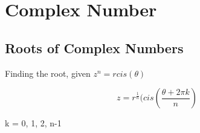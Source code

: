 \documentclass[../main.tex]{subfiles}
\begin{document}
\section{Complex Number}

\subsection{Roots of Complex Numbers}

Finding the root, given $z^n = r cis(\theta)$

\[ z = r^{\frac{1}{n}} (cis(\frac{\theta + 2 \pi k}{n}) \]

k = 0, 1, 2, n-1
\end{document}
